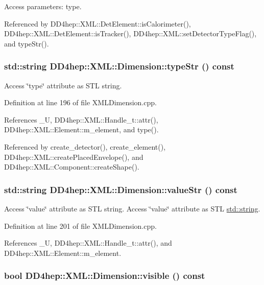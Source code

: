 Access parameters: type. 

Referenced by DD4hep::XML::DetElement::isCalorimeter(), DD4hep::XML::DetElement::isTracker(), DD4hep::XML::setDetectorTypeFlag(), and typeStr().\hypertarget{struct_d_d4hep_1_1_x_m_l_1_1_dimension_ae8e5a749f5b6ff42143e01b0fffa3c8b}{
\subsubsection[{typeStr}]{\setlength{\rightskip}{0pt plus 5cm}std::string DD4hep::XML::Dimension::typeStr () const}}
\label{struct_d_d4hep_1_1_x_m_l_1_1_dimension_ae8e5a749f5b6ff42143e01b0fffa3c8b}


Access \char`\"{}type\char`\"{} attribute as STL string. 

Definition at line 196 of file XMLDimension.cpp.

References \_\-U, DD4hep::XML::Handle\_\-t::attr(), DD4hep::XML::Element::m\_\-element, and type().

Referenced by create\_\-detector(), create\_\-element(), DD4hep::XML::createPlacedEnvelope(), and DD4hep::XML::Component::createShape().\hypertarget{struct_d_d4hep_1_1_x_m_l_1_1_dimension_a336539efb2d195550b7f87488abd5f46}{
\subsubsection[{valueStr}]{\setlength{\rightskip}{0pt plus 5cm}std::string DD4hep::XML::Dimension::valueStr () const}}
\label{struct_d_d4hep_1_1_x_m_l_1_1_dimension_a336539efb2d195550b7f87488abd5f46}


Access \char`\"{}value\char`\"{} attribute as STL string. Access \char`\"{}value\char`\"{} attribute as STL \hyperlink{classstd_1_1string}{std::string}. 

Definition at line 201 of file XMLDimension.cpp.

References \_\-U, DD4hep::XML::Handle\_\-t::attr(), and DD4hep::XML::Element::m\_\-element.\hypertarget{struct_d_d4hep_1_1_x_m_l_1_1_dimension_a05778b5b5725a3603ba33dba5dec34cf}{
\subsubsection[{visible}]{\setlength{\rightskip}{0pt plus 5cm}bool DD4hep::XML::Dimension::visible () const}}
\label{struct_d_d4hep_1_1_x_m_l_1_1_dimension_a05778b5b5725a3603ba33dba5dec34cf}


